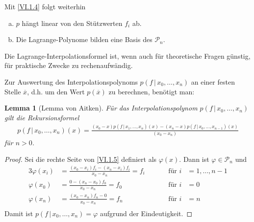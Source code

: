 \documentclass[ngerman,fontsize=11pt, paper=a4, parskip=half, titlepage=true, toc=bib]{scrbook}
\theoremstyle{definition}
\theoremstyle{plain}
\newtheorem{Lem}[Def]{Lemma}		%
\newcommand{\subsectione}[1]{\addtocounter{Def}{1}\subsection{#1}}
\newenvironment{Leme}[1][]{ %
	\begin{Lem}[#1]
	}
	{
	\end{Lem}
	\addtocounter{subsection}{1}
}
\begin{document}
    Mit \eqref{VI.1.4} folgt weiterhin
    \begin{enumerate}[a)]
    \item $p$ hängt linear von den Stützwerten $f_i$ ab.
    \item Die Lagrange-Polynome bilden eine Basis des $\mathcal{P}_n$.
    \end{enumerate}

    Die Lagrange-Interpolationsformel ist,
    wenn auch für theoretische Fragen günstig,
    für praktische Zwecke zu rechenaufwändig.

    Zur Auswertung des Interpolationspolynoms $p(f\,|\,x_0,\dots, x_n)$
    an einer festen Stelle $\overline{x}$, d.h.
    um den Wert $p(\overline{x} ) $ zu berechnen,
    benötigt man:

    \begin{Leme}[Lemma von Aitken]
    Für das Interpolationspolynom $p(f\,|\,x_0, \dots, x_n)$ gilt die 
    Rekursionsformel
    \begin{gather}
    p(f\,|\,x_0, \dots, x_n) (x) = \frac{(x_0-x)p(f\,|\,x_1,\dots, x_n)(x) -
    	(x_n-x)p(f\,|\,x_0,\dots, x_{n-1})(x)}
    {(x_0-x_n)}
    \label{VI.1.5}
    \end{gather}
    für $n>0$.	
    \end{Leme}
    
    \begin{proof}
      Sei die rechte Seite von \eqref{VI.1.5} definiert als $\varphi(x)$.
      Dann ist $\varphi\in\mathcal{P}_n$ und 
      \begin{alignat*}{3}
        \varphi(x_i) &= \frac{(x_0-x_i)f_i-(x_n-x_i)f_i}{x_0-x_n}= f_i\quad
        &&&\text{für } i&=1,\dots , n-1\\
        \varphi(x_0) &= \frac{0-(x_n-x_0)f_0}{x_0-x_n} = f_0
        &&&\text{für } i&=0\\
        \varphi(x_n) &= \frac{(x_0-x_n)f_n-0}{x_0-x_n} = f_n
        &&&\text{für } i&=n\\
      \end{alignat*}
      Damit ist $p(f\,|\,x_0, \dots, x_n) = \varphi$ aufgrund der Eindeutigkeit.
    \end{proof}

    
    
    
    
    \nocite{*} %

    


    \printindex		%

    \printbibliography	%


  
\end{document}
